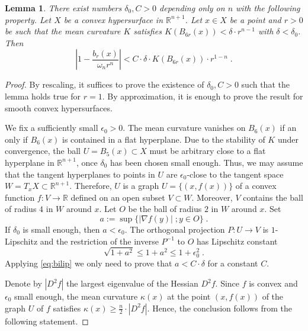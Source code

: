 \documentclass[12pt,leqno,intlimits]{amsart}
\numberwithin{equation}{section}
\newtheorem{lem}[thm]{Lemma}
\theoremstyle{definition}
\theoremstyle{remark}
\newcommand{\R}{\mathbb{R}}
\def\:{\colon}
\begin{document}

\begin{lem}  \label{lem:mean}
There exist numbers $\delta_0,C>0$ depending only on $n$ with the following property. Let $X$ be a convex hypersurface in $\R^{n+1}$.
Let $x\in X$ be a point and $r>0$ be such that the mean curvature $K$ satisfies  $K(B_{6r} (x))  < \delta \cdot r^{n-1}$ with $\delta <\delta _0$.
Then
\begin{equation} \label{eq:lemma}
| 1 -  \frac {b_r (x)} { \omega _n r^n}| < C\cdot \delta \cdot K( B_{6r} (x)) \cdot r^{1-n} \; .
\end{equation}
\end{lem}


\begin{proof}
By rescaling, it suffices to prove the existence of $\delta _0, C>0$ such that the lemma holds true for $r=1$.
By approximation, it is enough to prove the result for smooth convex hypersurfaces.


We fix a sufficiently small $\epsilon _0>0$.   The mean curvature vanishes on $B_6 (x)$ if an only if $B_6(x)$ is contained in a flat hyperplane.
 Due to  the stability of $K$ under convergence,      the ball $U=B_{5} (x) \subset X$ must be  arbitrary close to a flat hyperplane in $\R^{n+1}$,
once $\delta _0$ has been chosen small enough.  Thus, we may assume
 that  the tangent hyperplanes  to points in $U$  are $\epsilon_0$-close to  the tangent
space  $W =T_xX \subset \R^{n+1}$.  Therefore, $U$ is a graph  $U=\{(x,f(x))\}$ of a convex function $f\:V\to \R$ defined on an open subset $V\subset W$. Moreover, $V$ contains the ball of radius $4$ in $W$ around $x$. Let $O$
be the ball of radius $2$ in $W$ around $x$. Set
$$a :=\sup \{ |\nabla f (y)| \; ; y\in O \} \; .$$
If $\delta _0$ is small enough, then $a<\epsilon_0$.  The orthogonal projection $P\:U\to V$ is $1$-Lipschitz and the restriction of the inverse $P^{-1}$ to $O$  has Lipschitz constant  $$\sqrt {1+ a^2}  \leq 1+a^2 \leq 1+\epsilon_0 ^2 \; .$$
Applying \eqref{eq:bilip} we only need to prove that $a < C \cdot \delta $ for a constant $C$.

Denote by $|D^2f|$ the largest eigenvalue of the Hessian $D^2f$.  Since $f$ is convex and $\epsilon _0$ small enough,  the mean curvature $\mathcal \kappa (x)$ at the point $(x,f(x))$ of the graph $U$ of $f$ satisfies $\kappa (x) \geq \frac n 2  \cdot  |D^2 f|$.  Hence, the conclusion  follows from the following statement.



\end{proof}
\end{document}
